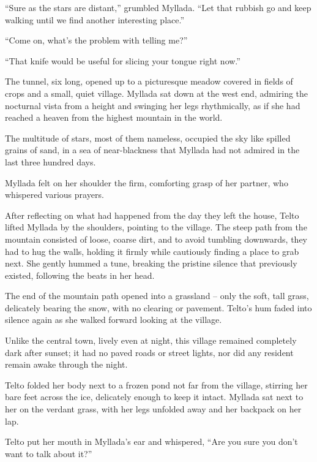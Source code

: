 ``Sure as the stars are distant,'' grumbled Myllada. ``Let that rubbish go and keep walking until we find another interesting place.''

``Come on, what's the problem with telling me?''

``That knife would be useful for slicing your tongue right now.''

\centeredstars

The tunnel, six \eletyn{} long, opened up to a picturesque meadow covered in fields of crops and a small, quiet village. Myllada sat down at the west end, admiring the nocturnal vista from a height and swinging her legs rhythmically, as if she had reached a heaven from the highest mountain in the world.

The multitude of stars, most of them nameless, occupied the sky like spilled grains of sand, in a sea of near-blackness that Myllada had not admired in the last three hundred days.

Myllada felt on her shoulder the firm, comforting grasp of her partner, who whispered various prayers.

After reflecting on what had happened from the day they left the house, Telto lifted Myllada by the shoulders, pointing to the village. The steep path from the mountain consisted of loose, coarse dirt, and to avoid tumbling downwards, they had to hug the walls, holding it firmly while cautiously finding a place to grab next. She gently hummed a tune, breaking the pristine silence that previously existed, following the beats in her head.

\centeredstars

The end of the mountain path opened into a grassland -- only the soft, tall grass, delicately bearing the snow, with no clearing or pavement. Telto's hum faded into silence again as she walked forward looking at the village.

Unlike the central town, lively even at night, this village remained completely dark after sunset; it had no paved roads or street lights, nor did any resident remain awake through the night.

Telto folded her body next to a frozen pond not far from the village, stirring her bare feet across the ice, delicately enough to keep it intact. Myllada sat next to her on the verdant grass, with her legs unfolded away and her backpack on her lap.

Telto put her mouth in Myllada's ear and whispered, ``Are you sure you don't want to talk about it?''

